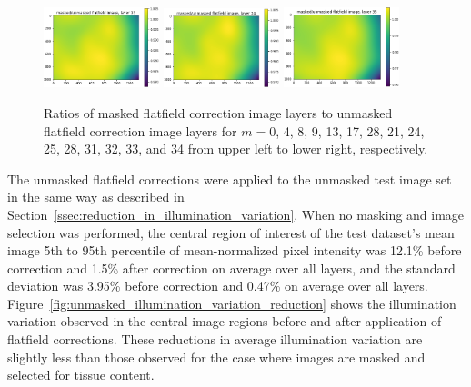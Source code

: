 \documentclass[letterpaper,11pt]{article}
\newcommand{\reffig}[1]{Figure~\ref{#1}}
\newcommand{\refsec}[1]{Section~\ref{#1}}
\begin{document}
\begin{figure}[!ht]
\includegraphics[width=0.3\textwidth]{images/results/masked_over_unmasked_flatfield_image_layers/masked_over_unmasked_flatfield_image_layer_33}
\includegraphics[width=0.3\textwidth]{images/results/masked_over_unmasked_flatfield_image_layers/masked_over_unmasked_flatfield_image_layer_34}
\includegraphics[width=0.3\textwidth]{images/results/masked_over_unmasked_flatfield_image_layers/masked_over_unmasked_flatfield_image_layer_35}
\caption{\footnotesize Ratios of masked flatfield correction image layers to unmasked flatfield correction image layers for $m=$0, 4, 8, 9, 13, 17, 28, 21, 24, 25, 28, 31, 32, 33, and 34 from upper left to lower right, respectively.}
\label{fig:masked_over_unmasked_flatfield_image_layers}
\end{figure}

The unmasked flatfield corrections were applied to the unmasked test image set in the same way as described in \refsec{ssec:reduction_in_illumination_variation}. When no masking and image selection was performed, the central region of interest of the test dataset's mean image 5th to 95th percentile of mean-normalized pixel intensity was 12.1\% before correction and 1.5\% after correction on average over all layers, and the standard deviation was 3.95\% before correction and 0.47\% on average over all layers. \reffig{fig:unmasked_illumination_variation_reduction} shows the illumination variation observed in the central image regions before and after application of flatfield corrections. These reductions in average illumination variation are slightly less than those observed for the case where images are masked and selected for tissue content. 
\end{document}
